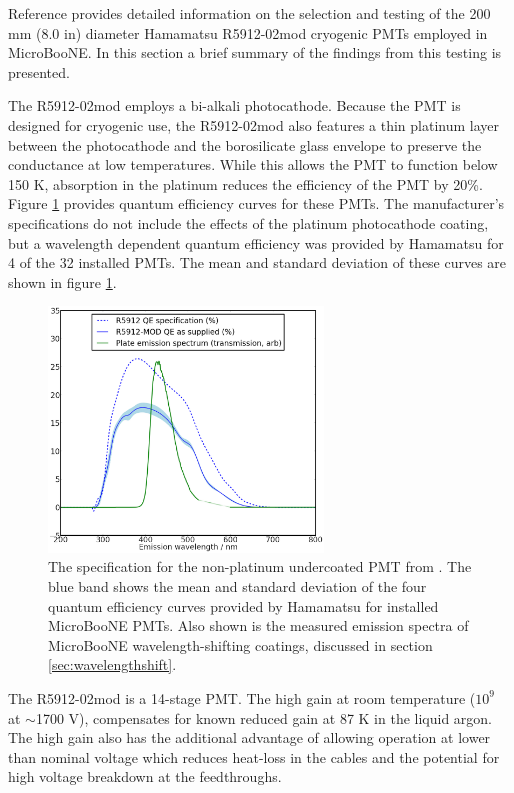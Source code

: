 Reference \cite{Briese:2013wua} provides detailed information on the selection 
and testing of the 200 mm (8.0 in) diameter Hamamatsu R5912-02mod cryogenic PMTs employed in MicroBooNE.   
In this section a brief summary of the findings from this testing is presented.

The R5912-02mod employs a bi-alkali photocathode.  Because the PMT is designed for cryogenic use, the R5912-02mod also features a thin platinum layer between the photocathode and the borosilicate glass envelope to preserve the conductance at low temperatures.   While this allows the PMT to function below 150 K, absorption in the platinum reduces the efficiency of the PMT by 20\%.
Figure \ref{fig:TPBSpectraPlate} provides quantum efficiency curves for these PMTs. The manufacturer's specifications do not include the effects of the platinum photocathode coating, but a wavelength dependent quantum efficiency was provided by Hamamatsu for 4 of the 32 installed PMTs.  The mean and standard deviation of these curves are shown in figure \ref{fig:TPBSpectraPlate}. 

\begin{figure}
\centering 
\includegraphics[width=0.65\textwidth]{./figures/PlateSpectra.png}
\caption{The specification for the non-platinum undercoated PMT from \cite{Hamamatsu-Datasheet8inch}.  The blue band shows the mean and standard deviation of the four quantum efficiency curves provided by Hamamatsu for installed MicroBooNE PMTs. Also shown is the measured emission spectra of MicroBooNE wavelength-shifting coatings, discussed in section \ref{sec:wavelengthshift}.  \cite{Jones:2015bya}
 \label{fig:TPBSpectraPlate}  }
\end{figure}


The  R5912-02mod is a 14-stage PMT.
The high gain at room temperature ($10^9$ at $\sim$1700 V), compensates for known reduced gain at 87 K in the liquid argon.  
The high gain also has the additional advantage of allowing operation at lower than nominal voltage which reduces heat-loss in the cables and the potential for high voltage breakdown at the feedthroughs.




